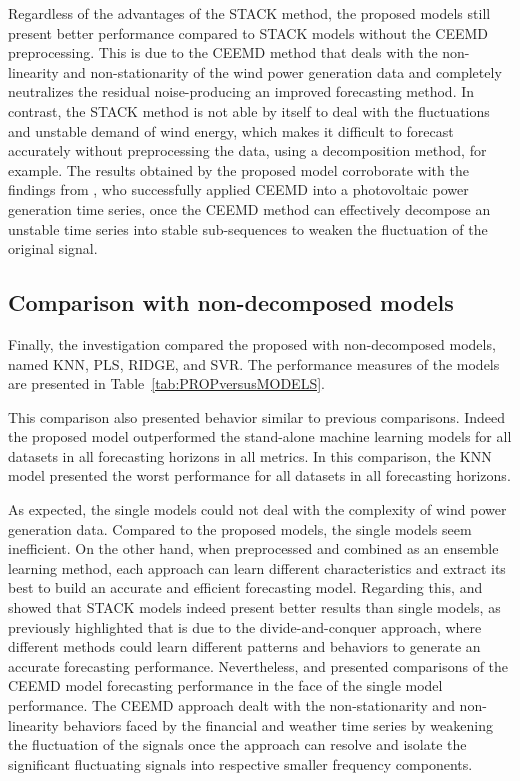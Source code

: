 Regardless of the advantages of the \ac{STACK} method, the proposed models still present better performance compared to \ac{STACK} models without the \ac{CEEMD} preprocessing. This is due to the \ac{CEEMD} method that deals with the non-linearity and non-stationarity of the wind power generation data and completely neutralizes the residual noise-producing an improved forecasting method. In contrast, the \ac{STACK} method is not able by itself to deal with the fluctuations and unstable demand of wind energy, which makes it difficult to forecast accurately without preprocessing the data, using a decomposition method, for example. The results obtained by the proposed model corroborate with the findings from , who successfully applied \ac{CEEMD} into a photovoltaic power generation time series, once the \ac{CEEMD} method can effectively decompose an unstable time series into stable sub-sequences to weaken the fluctuation of the original signal.

\subsection{Comparison with non-decomposed models \label{subsec:propVSmodels}}

Finally, the investigation compared the proposed with non-decomposed models, named \ac{KNN}, \ac{PLS}, \ac{RIDGE}, and \ac{SVR}. The performance measures of the models are presented in Table~\ref{tab:PROPversusMODELS}.

% 

This comparison also presented behavior similar to previous comparisons. Indeed the proposed model outperformed the stand-alone machine learning models for all datasets in all forecasting horizons in all metrics. In this comparison, the \ac{KNN} model presented the worst performance for all datasets in all forecasting horizons. 

As expected, the single models could not deal with the complexity of wind power generation data. Compared to the proposed models, the single models seem inefficient. On the other hand, when preprocessed and combined as an ensemble learning method, each approach can learn different characteristics and extract its best to build an accurate and efficient forecasting model. Regarding this,  and  showed that \ac{STACK} models indeed present better results than single models, as previously highlighted that is due to the divide-and-conquer approach, where different methods could learn different patterns and behaviors to generate an accurate forecasting performance. Nevertheless,  and  presented comparisons of the \ac{CEEMD} model forecasting performance in the face of the single model performance. The \ac{CEEMD} approach dealt with the non-stationarity and non-linearity behaviors faced by the financial and weather time series by weakening the fluctuation of the signals once the approach can resolve and isolate the significant fluctuating signals into respective smaller frequency components.

